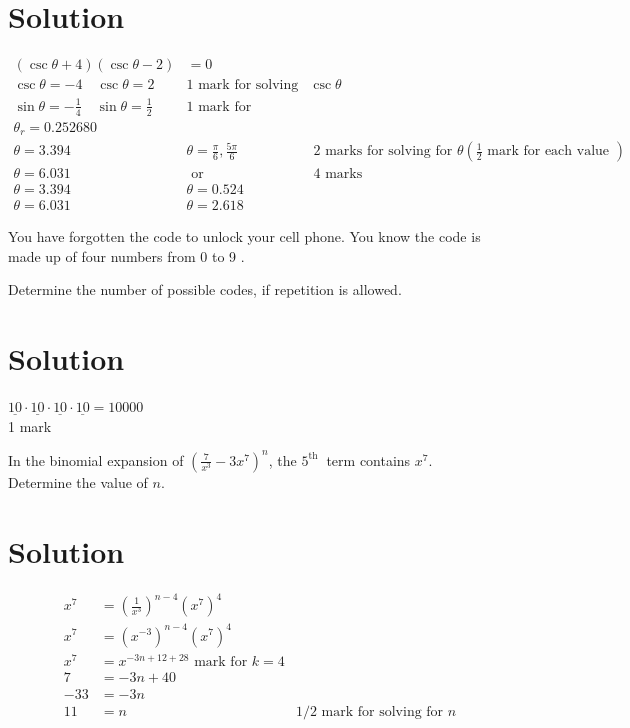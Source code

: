 \documentclass[10pt]{article}
\begin{document}
\section*{Solution}
$$
\begin{array}{rlr}
(\csc \theta+4)(\csc \theta-2) & =0 & \\
\csc \theta=-4 \quad \csc \theta=2 & 1 \text { mark for solving for } \csc \theta \\
\sin \theta=-\frac{1}{4} \quad \sin \theta=\frac{1}{2} & 1 \text { mark for reciprocal } \\
\theta_{r}=0.252680 & \\
\theta=3.394 & \theta=\frac{\pi}{6}, \frac{5 \pi}{6} & 2 \text { marks for solving for } \theta\left(\frac{1}{2} \text { mark for each value }\right) \\
\theta=6.031 & \text { or } & 4 \text { marks } \\
\theta=3.394 & \theta=0.524 & \\
\theta=6.031 & \theta=2.618 &
\end{array}
$$

You have forgotten the code to unlock your cell phone. You know the code is made up of four numbers from 0 to 9 .

Determine the number of possible codes, if repetition is allowed.

\section*{Solution}
$\underline{10} \cdot \underline{10} \cdot \underline{10} \cdot \underline{10}=10000$\\
1 mark

In the binomial expansion of $\left(\frac{7}{x^{3}}-3 x^{7}\right)^{n}$, the $5^{\text {th }}$ term contains $x^{7}$.\\
Determine the value of $n$.

\section*{Solution}
$$
\begin{array}{rlr}
x^{7} & =\left(\frac{1}{x^{3}}\right)^{n-4}\left(x^{7}\right)^{4} & \\
x^{7} & =\left(x^{-3}\right)^{n-4}\left(x^{7}\right)^{4} & \\
x^{7} & =x^{-3 n+12+28} \text { mark for } k=4 \\
7 & =-3 n+40 & \\
-33 & =-3 n & \\
11 & =n & 1 / 2 \text { mark for solving for } n
\end{array}
$$
\end{document}

